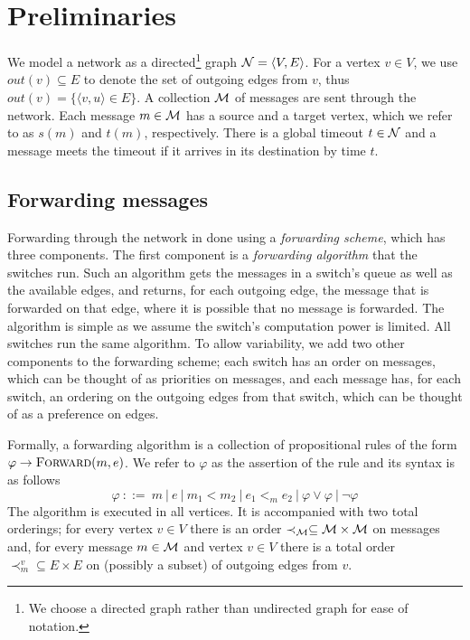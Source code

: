 \documentclass[11pt,eepic]{article}
\newcommand{\zug}[1]{\langle #1  \rangle}
\newcommand{\set}[1]{\{ #1  \}}
\newcommand{\N}{{\cal N}}
\newcommand{\M}{{\cal M}}
\newcommand{\Forw}{\mbox{\sc Forward}}
\begin{document}
\section{Preliminaries}
	We model a network as a directed\footnote{We choose a directed graph rather than undirected graph for ease of notation.} graph $\N = \zug{V, E}$.
	For a vertex $v \in V$, we use $out(v) \subseteq E$ to denote the set of outgoing edges from $v$, thus $out(v) = \set{\zug{v, u} \in E}$. A collection $\M$ of messages are sent through the network.
	Each message $m \in \M$ has a source and a target vertex, which we refer to as $s(m)$ and $t(m)$, respectively. There is a global timeout $t \in \N$ and a message meets the timeout if it arrives in its destination by time $t$.



	\subsection*{Forwarding messages}
		Forwarding through the network in done using a {\em forwarding scheme}, which has three components. The first component is a {\em forwarding algorithm} that the switches run. Such an algorithm gets the messages in a switch's queue as well as the available edges, and returns, for each outgoing edge, the message that is forwarded on that edge, where it is possible that no message is forwarded. The algorithm is simple as we assume the switch's computation power is limited. All switches run the same algorithm. To allow variability, we add two other components to the forwarding scheme; each switch has an order on messages, which can be thought of as priorities on messages, and each message has, for each switch, an ordering on the outgoing edges from that switch, which can be thought of as a preference on edges.

		Formally, a forwarding algorithm is a collection of propositional rules of the form $\varphi \rightarrow \Forw(m,e)$. We refer to $\varphi$ as the assertion of the rule and its syntax is as follows
		\[\varphi \ ::= \ m \ | \ e \ | \  m_1 < m_2 \ | \ e_1 <_m e_2  \ | \ \varphi \vee \varphi \ | \ \neg \varphi
		\]
		The algorithm is executed in all vertices. It is accompanied with two total orderings; for every vertex $v \in V$ there is an order $\prec_\M \subseteq \M \times \M$ on messages and, for every message $m \in \M$ and vertex $v \in V$ there is a total order $\prec_m^v \subseteq E \times E$ on (possibly a subset) of outgoing edges from $v$.
\end{document}
